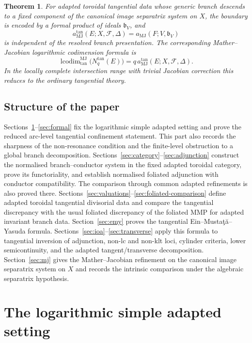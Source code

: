 \documentclass[11pt]{amsart}
\numberwithin{equation}{section}
\theoremstyle{plain}
\newtheorem{Theorem}{Theorem}[section]
\theoremstyle{definition}
\newcommand{\lcodim}{\operatorname{lcodim}}
\newcommand{\MJ}{\mathrm{MJ}}
\newcommand{\bbound}{\mathfrak b}
\newcommand{\cF}{\mathcal F}
\begin{document}
\begin{Theorem}
\label{thm:intro-mj}
For adapted toroidal tangential data whose generic branch descends to a fixed
component of the canonical image separatrix system on $X$, the boundary is
encoded by a formal product of ideals $\bbound_V$, and
\[
a^{\tan}_{\MJ}(E;X,\cF,\Delta)=a_{\MJ}(F;V,\bbound_V)
\]
is independent of the resolved branch presentation.  The corresponding
Mather--Jacobian logarithmic codimension formula is
\[
\lcodim^{\MJ}_{\tan}\bigl(N_q^{\tan}(E)\bigr)=q\,a^{\tan}_{\MJ}(E;X,\cF,\Delta).
\]
In the locally complete intersection range with trivial Jacobian correction
this reduces to the ordinary tangential theory.
\end{Theorem}

\subsection*{Structure of the paper}

Sections~\ref{sec:range}--\ref{sec:formal} fix the logarithmic simple
adapted setting and prove the reduced arc-level tangential confinement
statement.  This part also records the sharpness of the non-resonance
condition and the finite-level obstruction to a global branch decomposition.
Sections~\ref{sec:category}--\ref{sec:adjunction} construct the normalised
branch--conductor system in the fixed adapted toroidal category, prove its
functoriality, and establish normalised foliated adjunction with conductor
compatibility.  The comparison through common adapted refinements is also
proved there.
Sections~\ref{sec:valuations}--\ref{sec:foliated-comparison} define adapted
toroidal tangential divisorial data and compare the tangential discrepancy
with the usual foliated discrepancy of the foliated MMP for adapted invariant
branch data. 
Section~\ref{sec:emy} proves the tangential Ein--Musta\c{t}\u{a}--Yasuda
formula.  Sections~\ref{sec:ioa}--\ref{sec:transverse} apply this formula to
tangential inversion of adjunction, non-lc and non-klt loci, cylinder
criteria, lower semicontinuity, and the adapted tangent/transverse
decomposition. 
Section~\ref{sec:mj} gives the Mather--Jacobian refinement on the canonical
image separatrix system on $X$ and records the intrinsic comparison under the
algebraic separatrix hypothesis.


\section{The logarithmic simple adapted setting}
\label{sec:range}
\end{document}
